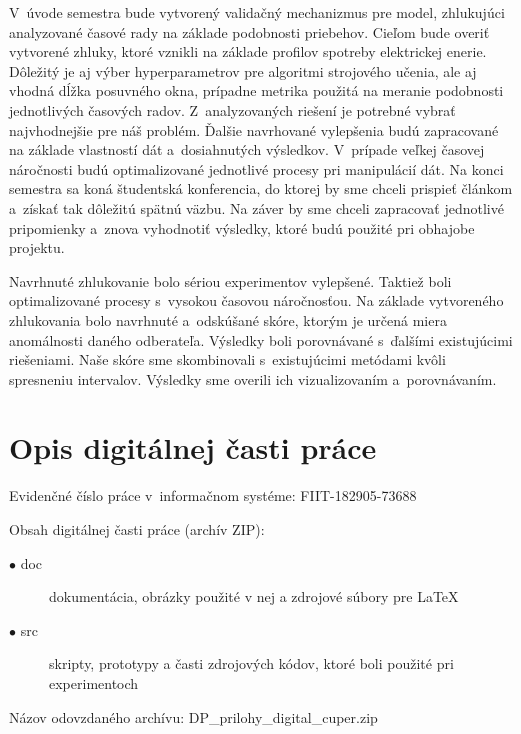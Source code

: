 \documentclass[a4paper,twoside,slovak,12pt,appendix]{article}
\begin{document}
\begin{appendices}
\begin{table}[!h]
\begin{tabular}{||l|p{}||}
    \hline
  \end{tabular}
\end{table}
\noindent
V~úvode semestra bude vytvorený validačný mechanizmus pre model, zhlukujúci
analyzované časové rady na základe podobnosti priebehov. Cieľom bude overiť
vytvorené zhluky, ktoré vznikli na základe profilov spotreby elektrickej enerie.
Dôležitý je aj výber hyperparametrov pre algoritmi strojového učenia, ale aj
vhodná dĺžka posuvného okna, prípadne metrika použitá na meranie podobnosti
jednotlivých časových radov. Z~analyzovaných riešení je potrebné vybrať
najvhodnejšie pre náš problém. Ďalšie navrhované vylepšenia budú zapracované na
základe vlastností dát a~dosiahnutých výsledkov. V~prípade veľkej časovej
náročnosti budú optimalizované jednotlivé procesy pri manipulácií dát. Na konci
semestra sa koná študentská konferencia, do ktorej by sme chceli prispieť
článkom a~získať tak dôležitú spätnú väzbu. Na záver by sme chceli zapracovať
jednotlivé pripomienky a~znova vyhodnotiť výsledky, ktoré budú použité pri
obhajobe projektu.

Navrhnuté zhlukovanie bolo sériou experimentov vylepšené. Taktiež boli
optimalizované procesy s~vysokou časovou náročnosťou. Na základe vytvoreného
zhlukovania bolo navrhnuté a~odskúšané skóre, ktorým je určená miera anomálnosti
daného odberateľa. Výsledky boli porovnávané s~ďalšími existujúcimi riešeniami.
Naše skóre sme skombinovali s~existujúcimi metódami kvôli spresneniu intervalov.
Výsledky sme overili ich vizualizovaním a~porovnávaním.

\section{Opis digitálnej časti práce}
Evidenčné číslo práce v~informačnom systéme: FIIT-182905-73688

Obsah digitálnej časti práce (archív ZIP):

\begin{description}
  \item[$\bullet$ doc] dokumentácia, obrázky použité v nej a zdrojové súbory pre LaTeX
  \item[$\bullet$ src] skripty, prototypy a časti zdrojových kódov, ktoré boli použité pri experimentoch
\end{description}

Názov odovzdaného archívu: DP\_prilohy\_digital\_cuper.zip

\end{appendices}
\end{document}
